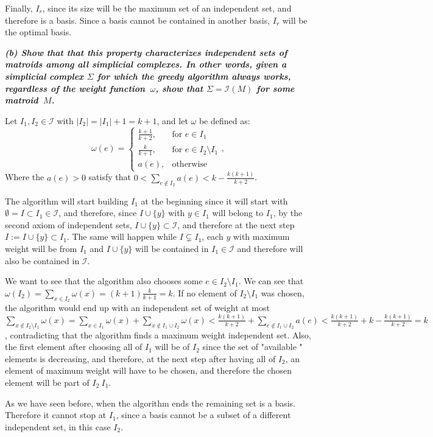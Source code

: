 Finally, $I_r$, since its size will be the maximum set of an independent set, and therefore is a basis. Since a basis cannot be contained in another basis, $I_r$ will be the optimal basis.
\vspace{3pt}

\hspace{5pt}\textbf{\textit{(b) Show that that this property characterizes independent sets of matroids among all simplicial complexes. In other words, given a simplicial complex $\Sigma$ for which the greedy algorithm always works, regardless of the weight function~$\omega$, show that $\Sigma = \mathcal I(M)$ for some matroid~$M$.}}

\vspace{3pt}

Let $I_1, I_2 \in \mathcal I$ with $|I_2| = |I_1| + 1 = k + 1$, and let $\omega$ be defined as:
\[
\omega(e) = \left\{
\begin{array}{lr}
	\frac{k+1}{k+2}, & \text{for } e \in I_1 \\
	\frac{k}{k+1}, & \text{for } e \in I_2 \setminus I_1\\
    a(e), & \text{otherwise }
\end{array}
\right. ,
\]
Where the $a(e) > 0$ satisfy that $0 < \sum_{e \notin I_2} a(e) < k - \frac{k(k+1)}{k+2}$.

The algorithm will start building $I_1$ at the beginning since it will start with $\emptyset = I \subset I_1 \in \mathcal I$, and therefore, since $I \cup \{y\}$ with $y \in I_1$ will belong to $I_1$, by the second axiom of independent sets, $I \cup \{y\} \subset \mathcal I$, and therefore at the next step $I := I \cup \{y\} \subset I_1$. The same will happen while $I \subsetneq I_1$, each $y$ with maximum weight will be from $I_1$ and $I \cup \{y\}$ will be contained in $I_1 \in \mathcal I$ and therefore will also be contained in $\mathcal I$.

We want to see that the algorithm also chooses some $e \in I_2 \setminus I_1$. We can see that $\omega(I_2) = \sum_{x \in I_2} \omega(x) = (k+1) \frac{k}{k+1} = k$. If no element of $I_2 \setminus I_1$ was chosen, the algorithm would end up with an independent set of weight at most $\sum_{x \notin I_2 \setminus I_1} \omega(x) = \sum_{x \in I_1} \omega(x) + \sum_{x \notin I_1 \cup I_2} \omega(x) < \frac{k(k+1)}{k+2} + \sum_{e \notin I_1 \cup I_2} a(e) <  \frac{k(k+1)}{k+2} + k - \frac{k(k+1)}{k+2} = k$, contradicting that the algorithm finds a maximum weight independent set. Also, the first element after choosing all of $I_1$ will be of $I_2$ since the set of "available " elements is decreasing, and therefore, at the next step after having all of $I_2$, an element of maximum weight will have to be chosen, and therefore the chosen element will be part of $I_2 \ I_1$.

As we have seen before, when the algorithm ends the remaining set is a basis. Therefore it cannot stop at $I_1$, since a basis cannot be a subset of a different independent set, in this case $I_2$.
